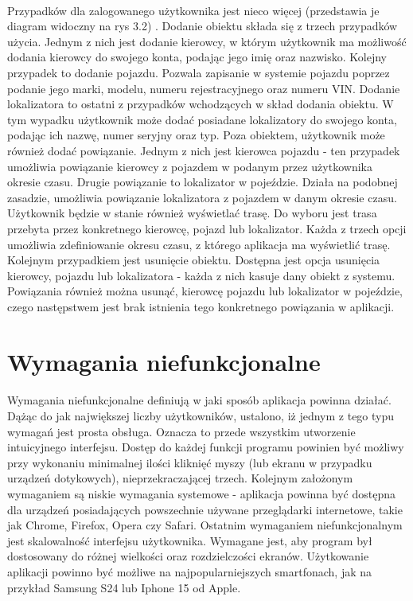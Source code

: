 \paragraph{}
Przypadków dla zalogowanego użytkownika jest nieco więcej (przedstawia je diagram widoczny na rys 3.2) . Dodanie obiektu składa się z trzech przypadków użycia. Jednym z nich jest dodanie kierowcy, w którym użytkownik ma możliwość dodania kierowcy do swojego konta, podając jego imię oraz nazwisko. Kolejny przypadek to dodanie pojazdu. Pozwala zapisanie w systemie pojazdu poprzez podanie jego marki, modelu, numeru rejestracyjnego oraz numeru VIN. Dodanie lokalizatora to ostatni z przypadków wchodzących w skład dodania obiektu. W tym wypadku użytkownik może dodać posiadane lokalizatory do swojego konta, podając ich nazwę, numer seryjny oraz typ. Poza obiektem, użytkownik może również dodać powiązanie. Jednym z nich jest kierowca pojazdu - ten przypadek umożliwia powiązanie kierowcy z pojazdem w podanym przez użytkownika okresie czasu. Drugie powiązanie to  lokalizator w pojeździe. Działa na podobnej zasadzie, umożliwia powiązanie lokalizatora z pojazdem w danym okresie czasu. Użytkownik będzie w stanie również wyświetlać trasę. Do wyboru jest trasa przebyta przez konkretnego kierowcę, pojazd lub lokalizator. Każda z trzech opcji umożliwia zdefiniowanie okresu czasu, z którego aplikacja ma wyświetlić trasę. Kolejnym przypadkiem jest usunięcie obiektu. Dostępna jest opcja usunięcia kierowcy, pojazdu lub lokalizatora - każda z nich kasuje dany obiekt z systemu. Powiązania również można usunąć, kierowcę pojazdu lub lokalizator w pojeździe, czego następstwem jest brak istnienia tego konkretnego powiązania w aplikacji.

\section{Wymagania niefunkcjonalne}
\paragraph{}
Wymagania niefunkcjonalne definiują w jaki sposób aplikacja powinna działać. Dążąc do jak największej liczby użytkowników, ustalono, iż jednym z tego typu wymagań jest prosta obsługa. Oznacza to przede wszystkim utworzenie intuicyjnego interfejsu. Dostęp do każdej funkcji programu powinien być możliwy przy wykonaniu minimalnej ilości kliknięć myszy (lub ekranu w przypadku urządzeń dotykowych), nieprzekraczającej trzech. Kolejnym założonym wymaganiem są niskie wymagania systemowe - aplikacja powinna być dostępna dla urządzeń posiadających powszechnie używane przeglądarki internetowe, takie jak Chrome, Firefox, Opera czy Safari. Ostatnim wymaganiem niefunkcjonalnym jest skalowalność interfejsu użytkownika. Wymagane jest, aby program był dostosowany do różnej wielkości oraz rozdzielczości ekranów. Użytkowanie aplikacji powinno być możliwe na najpopularniejszych smartfonach, jak na przykład Samsung S24 lub Iphone 15 od Apple.

